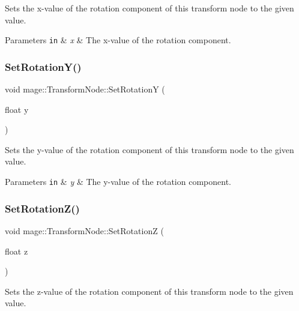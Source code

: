 Sets the x-\/value of the rotation component of this transform node to the given value.


\begin{DoxyParams}[1]{Parameters}
\mbox{\tt in}  & {\em x} & The x-\/value of the rotation component. \\
\hline
\end{DoxyParams}
\hypertarget{classmage_1_1_transform_node_a60188cf67c3d08f30c9d7c970351b8d3}{}\label{classmage_1_1_transform_node_a60188cf67c3d08f30c9d7c970351b8d3} 
\subsubsection{\texorpdfstring{Set\+Rotation\+Y()}{SetRotationY()}}
{\footnotesize\ttfamily void mage\+::\+Transform\+Node\+::\+Set\+RotationY (\begin{DoxyParamCaption}\item[{float}]{y }\end{DoxyParamCaption})}

Sets the y-\/value of the rotation component of this transform node to the given value.


\begin{DoxyParams}[1]{Parameters}
\mbox{\tt in}  & {\em y} & The y-\/value of the rotation component. \\
\hline
\end{DoxyParams}
\hypertarget{classmage_1_1_transform_node_a8977f1c3b822398e449d9042a5e3cee0}{}\label{classmage_1_1_transform_node_a8977f1c3b822398e449d9042a5e3cee0} 
\subsubsection{\texorpdfstring{Set\+Rotation\+Z()}{SetRotationZ()}}
{\footnotesize\ttfamily void mage\+::\+Transform\+Node\+::\+Set\+RotationZ (\begin{DoxyParamCaption}\item[{float}]{z }\end{DoxyParamCaption})}

Sets the z-\/value of the rotation component of this transform node to the given value.


